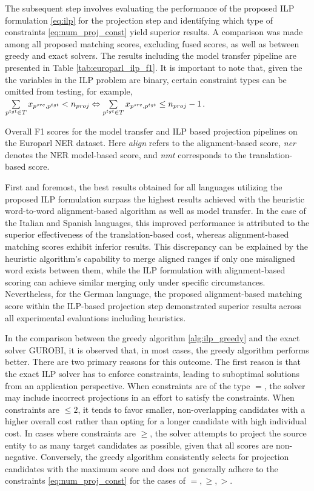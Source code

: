 The subsequent step involves evaluating the performance of the proposed ILP
formulation \eqref{eq:ilp} for the projection step and identifying which type
of constraints \eqref{eq:num_proj_const} yield superior results. A
comparison was made among all proposed matching scores, excluding fused scores,
as well as between greedy and exact solvers. The results including the model transfer pipeline
are presented in Table \ref{tab:europarl_ilp_f1}. It is important to note that, given the
the variables in the ILP problem are binary, certain constraint types can be
omitted from testing, for example,
\( \sum\limits_{p^{tgt} \in T} x_{p^{src}, p^{tgt}} < n_{proj} \Leftrightarrow \sum\limits_{p^{tgt} \in T} x_{p^{src}, p^{tgt}} \leq n_{proj} - 1 \).

\begin{table}[t]
  \centering
  
  \caption{Overall F1 scores for the model transfer and ILP based projection pipelines
    on the Europarl NER dataset. Here \textit{align} refers to the alignment-based score,
    \textit{ner} denotes the NER model-based score, and \textit{nmt} corresponds to
  the translation-based score.}
  \label{tab:europarl_ilp_f1}
\end{table}

First and foremost, the best results obtained for all languages utilizing the
proposed ILP formulation surpass the highest results achieved with the heuristic
word-to-word alignment-based algorithm as well as model transfer. In the case of the Italian and Spanish languages,
this improved performance is attributed to the superior effectiveness of the
translation-based cost, whereas alignment-based matching scores exhibit inferior results.
This discrepancy can be explained by the heuristic algorithm's capability to merge aligned
ranges if only one misaligned word exists between them, while the ILP formulation with
alignment-based scoring can achieve similar merging only under specific circumstances.
Nevertheless, for the German language, the proposed alignment-based matching score
within the ILP-based projection step demonstrated superior results across
all experimental evaluations including heuristics.

In the comparison between the greedy algorithm \ref{alg:ilp_greedy} and the exact solver
GUROBI, it is observed that, in most cases, the greedy algorithm performs better.
There are two primary reasons for this outcome. The first reason is that the exact
ILP solver has to enforce constraints, leading to suboptimal solutions from an
application perspective. When constraints are of the type \( = \), the solver may
include incorrect projections in an effort to satisfy the constraints. When constraints
are \( \leq 2 \), it tends to favor smaller, non-overlapping candidates with a higher
overall cost rather than opting for a longer candidate with high individual cost. In cases where
constraints are \( \geq \), the solver attempts to project the source entity to as many
target candidates as possible, given that all scores are non-negative.
Conversely, the greedy algorithm consistently selects for projection candidates with
the maximum score and does not generally adhere to the constraints \eqref{eq:num_proj_const}
for the cases of \( =, \geq, > \).

